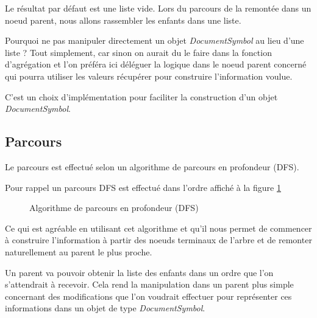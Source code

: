 \documentclass[
    iict, %
    il, %
]{heig-tb}
\begin{document}
Le résultat par défaut est une liste vide. Lors du parcours de la remontée dans un noeud parent, nous allons rassembler les enfants dans une liste.

Pourquoi ne pas manipuler directement un objet \emph{DocumentSymbol} au lieu d'une liste ?
Tout simplement, car sinon on aurait du le faire dans la fonction d'agrégation et l'on préféra ici déléguer la logique dans le noeud parent concerné
qui pourra utiliser les valeurs récupérer pour construire l'information voulue.

C'est un choix d'implémentation pour faciliter la construction d'un objet \emph{DocumentSymbol}.

\subsection{Parcours}
Le parcours est effectué selon un algorithme de parcours en profondeur (DFS).

Pour rappel un parcours DFS est effectué dans l'ordre affiché à la figure \ref*{Algorithme de parcours en profondeur (DFS)}

\begin{figure}[!h]
    \begin{center}
    \end{center}
    \caption[Algorithme de parcours en profondeur (DFS)]{\label{Algorithme de parcours en profondeur (DFS)} Algorithme de parcours en profondeur (DFS)}
\end{figure}

Ce qui est agréable en utilisant cet algorithme et qu'il nous permet de commencer à construire l'information à partir des noeuds terminaux
de l'arbre et de remonter naturellement au parent le plus proche.

Un parent va pouvoir obtenir la liste des enfants dans un ordre que l'on s'attendrait à recevoir.
Cela rend la manipulation dans un parent plus simple concernant des modifications que l'on voudrait effectuer pour représenter ces informations
dans un objet de type \emph{DocumentSymbol}.
\end{document}
